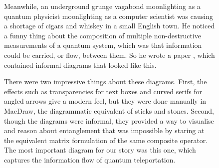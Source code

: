\begin{figure}[h!]
\centering
{}
\caption{Meanwhile, an underground grunge vagabond moonlighting as a quantum physicist moonlighting as a computer scientist was causing a shortage of cigars and whiskey in a small English town. He noticed a funny thing about the composition of multiple non-destructive measurements of a quantum system, which was that information could be carried, or flow, between them. So he wrote a paper \citep{coeckeLogicEntanglement2004}, which contained informal diagrams that looked like this.}
\end{figure}

\begin{figure}[h!]
\centering
{}
\caption{There were two impressive things about these diagrams. First, the effects such as transparencies for text boxes and curved serifs for angled arrows give a modern feel, but they were done manually in MacDraw, the diagrammatic equivalent of sticks and stones. Second, though the diagrams were informal, they provided a way to visualise and reason about entanglement that was impossible by staring at the equivalent matrix formulation of the same composite operator. The most important diagram for our story was this one, which captures the information flow of quantum teleportation.}
\end{figure}
\clearpage

